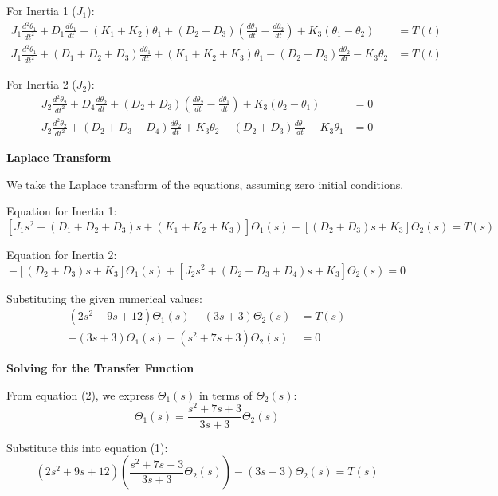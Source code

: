 \documentclass[11pt]{article}
\begin{document}
\vspace{8pt}

{For Inertia 1 ($J_1$):}
\begin{align*}
    J_1 \frac{d^2\theta_1}{dt^2} + D_1 \frac{d\theta_1}{dt} + (K_1+K_2) \theta_1 + (D_2+D_3)\left(\frac{d\theta_1}{dt} - \frac{d\theta_2}{dt}\right) + K_3(\theta_1 - \theta_2) &= T(t) \\
    J_1 \frac{d^2\theta_1}{dt^2} + (D_1+D_2+D_3)\frac{d\theta_1}{dt} + (K_1+K_2+K_3)\theta_1 - (D_2+D_3)\frac{d\theta_2}{dt} - K_3\theta_2 &= T(t)
\end{align*}

{For Inertia 2 ($J_2$):}
\begin{align*}
    J_2 \frac{d^2\theta_2}{dt^2} + D_4 \frac{d\theta_2}{dt} + (D_2+D_3)\left(\frac{d\theta_2}{dt} - \frac{d\theta_1}{dt}\right) + K_3(\theta_2 - \theta_1) &= 0 \\
    J_2 \frac{d^2\theta_2}{dt^2} + (D_2+D_3+D_4)\frac{d\theta_2}{dt} + K_3\theta_2 - (D_2+D_3)\frac{d\theta_1}{dt} - K_3\theta_1 &= 0
\end{align*}

\newpage
\noindent\textbf{Laplace Transform}

\vspace{12pt}

We take the Laplace transform of the equations, assuming zero initial conditions.

\vspace{8pt}

Equation for Inertia 1:
\[
[J_1 s^2 + (D_1+D_2+D_3)s + (K_1+K_2+K_3)]\Theta_1(s) - [(D_2+D_3)s + K_3]\Theta_2(s) = T(s)
\]

Equation for Inertia 2:
\[
-[(D_2+D_3)s + K_3]\Theta_1(s) + [J_2 s^2 + (D_2+D_3+D_4)s + K_3]\Theta_2(s) = 0
\]

Substituting the given numerical values:
\begin{align}
    (2s^2 + 9s + 12)\Theta_1(s) - (3s + 3)\Theta_2(s) &= T(s) \tag{1} \\
    -(3s + 3)\Theta_1(s) + (s^2 + 7s + 3)\Theta_2(s) &= 0 \tag{2}
\end{align}

\noindent\textbf{Solving for the Transfer Function}
\vspace{8pt}

From equation (2), we express $\Theta_1(s)$ in terms of $\Theta_2(s)$:
\[
\Theta_1(s) = \frac{s^2 + 7s + 3}{3s + 3} \Theta_2(s)
\]

Substitute this into equation (1):
\[
(2s^2 + 9s + 12) \left( \frac{s^2 + 7s + 3}{3s + 3} \Theta_2(s) \right) - (3s + 3)\Theta_2(s) = T(s)
\]
\end{document}
